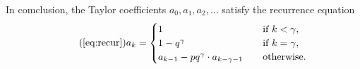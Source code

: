 \documentclass{article}
\begin{document}
In comclusion, the Taylor coefficients $a_0, a_1, a_2, \ldots$ satisfy the
recurrence equation
\begin{equation}
\tag{\ref{eq:recur}}
a_k = 
\begin{cases}
1            &\quad\text{if } k < \gamma, \\
1 -q^\gamma &\quad\text{if } k = \gamma, \\
a_{k-1} -pq^\gamma \cdot a_{k-\gamma-1} &\quad\text{otherwise.}
\end{cases}
\end{equation}
\end{document}

